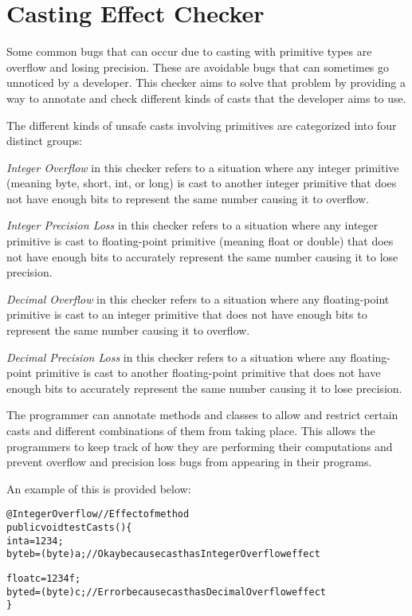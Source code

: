 \htmlhr
\chapter{Casting Effect Checker\label{castingeffect-checker}}

Some common bugs that can occur due to casting with primitive types are overflow and losing precision. These are avoidable bugs that can sometimes go unnoticed by a developer. This checker aims to solve that problem by providing a way to annotate and check different kinds of casts that the developer aims to use.

\noindent
The different kinds of unsafe casts involving primitives are categorized into four distinct groups:

\emph{Integer Overflow} in this checker refers to a situation where any integer primitive (meaning byte, short, int, or long) is cast to another integer primitive that does not have enough bits to represent the same number causing it to overflow.

\emph{Integer Precision Loss} in this checker refers to a situation where any integer primitive is cast to floating-point primitive (meaning float or double) that does not have enough bits to accurately represent the same number causing it to lose precision.

\emph{Decimal Overflow} in this checker refers to a situation where any floating-point primitive is cast to an integer primitive that does not have enough bits to represent the same number causing it to overflow.

\emph{Decimal Precision Loss} in this checker refers to a situation where any floating-point primitive is cast to another floating-point primitive that does not have enough bits to accurately represent the same number causing it to lose precision.

The programmer can annotate methods and classes to allow and restrict certain casts and different combinations of them from taking place. This allows the programmers to keep track of how they are performing their computations and prevent overflow and precision loss bugs from appearing in their programs.

\noindent
An example of this is provided below:

\begin{alltt}
@IntegerOverflow //Effect of method
public void testCasts() \{
    int a = 1234;
    byte b = (byte) a; //Okay because cast has IntegerOverflow effect

    float c = 1234f;
    byte d = (byte) c; //Error because cast has DecimalOverflow effect
\}
\end{alltt}

